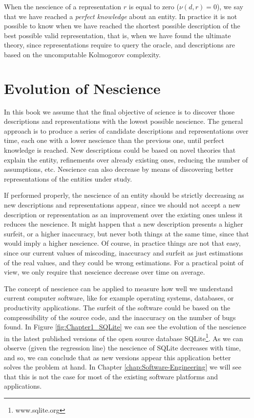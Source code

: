 When the nescience of a representation $r$ is equal to zero ($\nu(d, r)=0$), we say that we have reached a \emph{perfect knowledge} about an entity. In practice it is not possible to know when we have reached the shortest possible description of the best possible valid representation, that is, when we have found the ultimate theory, since representations require to query the oracle, and descriptions are based on the uncomputable Kolmogorov complexity.

%
%

\section{Evolution of Nescience}

In this book we assume that the final objective of science is to discover those descriptions and representations with the lowest possible nescience. The general approach is to produce a series of candidate descriptions and representations over time, each one with a lower nescience than the previous one, until perfect knowledge is reached. New descriptions could be based on novel theories that explain the entity, refinements over already existing ones, reducing the number of assumptions, etc. Nescience can also decrease by means of discovering better representations of the entities under study.

If performed properly, the nescience of an entity should be strictly decreasing as new descriptions and representations appear, since we should not accept a new description or representation as an improvement over the existing ones unless it reduces the nescience. It might happen that a new description presents a higher surfeit, or a higher inaccuracy, but never both things at the same time, since that would imply a higher nescience. Of course, in practice things are not that easy, since our current values of miscoding, inaccuracy and surfeit as just estimations of the real values, and they could be wrong estimations. For a practical point of view, we only require that nescience decrease over time on average.

\begin{example}
The concept of nescience can be applied to measure how well we understand current computer software, like for example operating systems, databases, or productivity applications. The surfeit of the software could be based on the compressibility of the source code, and the inaccuracy on the number of bugs found. In Figure \ref{fig:Chapter1_SQLite} we can see the evolution of the nescience in the latest published versions of the open source database SQLite\footnote{www.sqlite.org}. As we can observe (given the regression line) the nescience of SQLite decreases with time, and so, we can conclude that as new versions appear this application better solves the problem at hand. In Chapter \ref{chap:Software-Engineering} we will see that this is not the case for most of the existing software platforms and applications.
\end{example}


